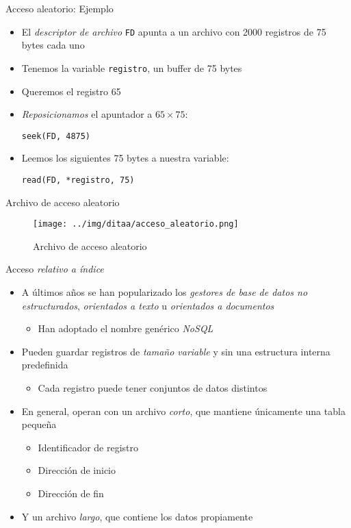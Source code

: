 \documentclass[presentation]{beamer}
\begin{document}
\begin{frame}[label={sec:orgddd2790},fragile]{Acceso aleatorio: Ejemplo}
 \begin{itemize}
\item El \emph{descriptor de archivo} \texttt{FD} apunta a un archivo con 2000
registros de 75 bytes cada uno
\item Tenemos la variable \texttt{registro}, un buffer de 75 bytes
\item Queremos el registro 65
\item \emph{Reposicionamos} el apuntador a \(65 \times 75\):

\texttt{seek(FD, 4875)}
\item Leemos los siguientes 75 bytes a nuestra variable:

\texttt{read(FD, *registro, 75)}
\end{itemize}
\end{frame}

\begin{frame}[label={sec:orgfac182f}]{Archivo de acceso aleatorio}
\begin{figure}[htbp]
\centering
\texttt{[image: ../img/ditaa/acceso\_aleatorio.png]}
\caption{Archivo de acceso aleatorio}
\end{figure}
\end{frame}

\begin{frame}[label={sec:orgf630c05}]{Acceso \emph{relativo a índice}}
\begin{itemize}
\item A últimos años se han popularizado los \emph{gestores de base de datos no
estructurados}, \emph{orientados a texto} u \emph{orientados a documentos}
\begin{itemize}
\item Han adoptado el nombre genérico \emph{NoSQL}
\end{itemize}
\item Pueden guardar registros de \emph{tamaño variable} y sin una estructura
interna predefinida
\begin{itemize}
\item Cada registro puede tener conjuntos de datos distintos
\end{itemize}
\item En general, operan con un archivo \emph{corto}, que mantiene únicamente
una tabla pequeña
\begin{itemize}
\item Identificador de registro
\item Dirección de inicio
\item Dirección de fin
\end{itemize}
\item Y un archivo \emph{largo}, que contiene los datos propiamente
\end{itemize}
\end{frame}
\end{document}
